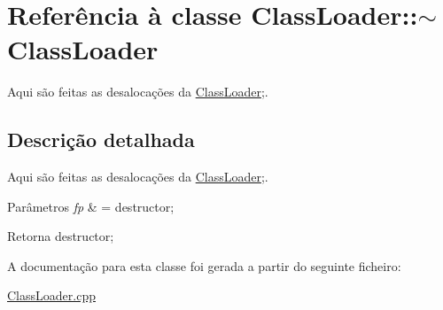 \hypertarget{class_class_loader_1_1~_class_loader}{}\section{Referência à classe Class\+Loader\+:\+:$\sim$\+Class\+Loader}
\label{class_class_loader_1_1~_class_loader}


Aqui são feitas as desalocações da \hyperlink{class_class_loader_1_1_class_loader}{Class\+Loader};.  




\subsection{Descrição detalhada}
Aqui são feitas as desalocações da \hyperlink{class_class_loader_1_1_class_loader}{Class\+Loader};. 


\begin{DoxyParams}{Parâmetros}
{\em fp} & = destructor; \\
\hline
\end{DoxyParams}
\begin{DoxyReturn}{Retorna}
destructor; 
\end{DoxyReturn}


A documentação para esta classe foi gerada a partir do seguinte ficheiro\+:\begin{DoxyCompactItemize}
\item 
\hyperlink{_class_loader_8cpp}{Class\+Loader.\+cpp}\end{DoxyCompactItemize}
